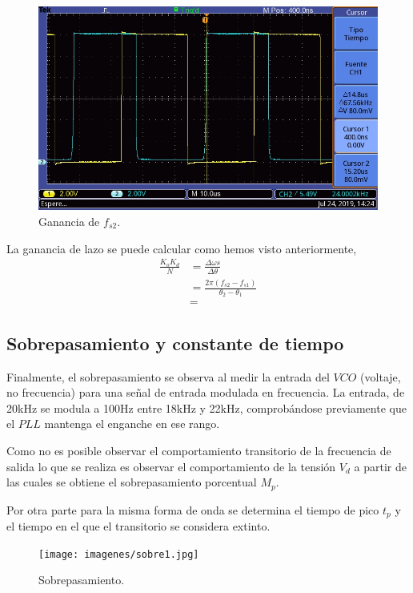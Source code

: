 \documentclass[twocolumn]{article}
\begin{document}
\begin{figure}[H]
  \centering    
  \includegraphics[width=\columnwidth]{imagenes/osc2.jpg}
  \caption{Ganancia de $f_{s2}$.}\label{fig:osc2}
\end{figure}

La ganancia de lazo se puede calcular como hemos visto anteriormente,
\begin{align*}
	\frac{K_o K_d}{N} &= \frac{\Delta \omega s}{\Delta \theta} \\
					  &= \frac{2 \pi (f_{s2} - f_{s1})} {\theta_2 - \theta_1} \\
					  &= 
\end{align*}

\subsection{Sobrepasamiento y constante de tiempo}
Finalmente, el sobrepasamiento se observa al medir la entrada del $VCO$ (voltaje, no frecuencia) para una señal de entrada modulada en frecuencia. La entrada, de 20kHz se modula a 100Hz entre 18kHz y 22kHz, comprobándose previamente que el $PLL$ mantenga el enganche en ese rango.

Como no es posible observar el comportamiento transitorio de la frecuencia de salida lo que se realiza es observar el comportamiento de la tensión $V_d$ a partir de las cuales se obtiene el sobrepasamiento porcentual $M_{p}$.

Por otra parte para la misma forma de onda se determina el tiempo de pico $t_p$ y el tiempo en el que el transitorio se considera extinto.

\begin{figure}[H]
  \centering    
  \texttt{[image: imagenes/sobre1.jpg]}
  \caption{Sobrepasamiento.}\label{fig:sobre1}
\end{figure}
\end{document}
